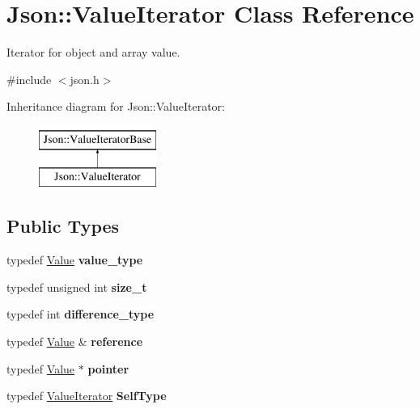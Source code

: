 \hypertarget{class_json_1_1_value_iterator}{}\section{Json\+:\+:Value\+Iterator Class Reference}
\label{class_json_1_1_value_iterator}


Iterator for object and array value.  




{\ttfamily \#include $<$json.\+h$>$}

Inheritance diagram for Json\+:\+:Value\+Iterator\+:\begin{figure}[H]
\begin{center}
\leavevmode
\includegraphics[height=2.000000cm]{class_json_1_1_value_iterator}
\end{center}
\end{figure}
\subsection*{Public Types}
\begin{DoxyCompactItemize}
\item 
\hypertarget{class_json_1_1_value_iterator_a2c5ba7be611f05546530c8a88b2d2e37}{}typedef \hyperlink{class_json_1_1_value}{Value} {\bfseries value\+\_\+type}\label{class_json_1_1_value_iterator_a2c5ba7be611f05546530c8a88b2d2e37}

\item 
\hypertarget{class_json_1_1_value_iterator_a308b8932ffc83eaa9d12dadd5c11a7dd}{}typedef unsigned int {\bfseries size\+\_\+t}\label{class_json_1_1_value_iterator_a308b8932ffc83eaa9d12dadd5c11a7dd}

\item 
\hypertarget{class_json_1_1_value_iterator_a2be1a9aa60bbfc8812e9dd1a7f1a8786}{}typedef int {\bfseries difference\+\_\+type}\label{class_json_1_1_value_iterator_a2be1a9aa60bbfc8812e9dd1a7f1a8786}

\item 
\hypertarget{class_json_1_1_value_iterator_ae87929b4567aa00372cf602c43b57160}{}typedef \hyperlink{class_json_1_1_value}{Value} \& {\bfseries reference}\label{class_json_1_1_value_iterator_ae87929b4567aa00372cf602c43b57160}

\item 
\hypertarget{class_json_1_1_value_iterator_acec45feb1ef1f3bf81240157d06d5432}{}typedef \hyperlink{class_json_1_1_value}{Value} $\ast$ {\bfseries pointer}\label{class_json_1_1_value_iterator_acec45feb1ef1f3bf81240157d06d5432}

\item 
\hypertarget{class_json_1_1_value_iterator_a23357670fdad61792670d86f62db7e16}{}typedef \hyperlink{class_json_1_1_value_iterator}{Value\+Iterator} {\bfseries Self\+Type}\label{class_json_1_1_value_iterator_a23357670fdad61792670d86f62db7e16}

\end{DoxyCompactItemize}
